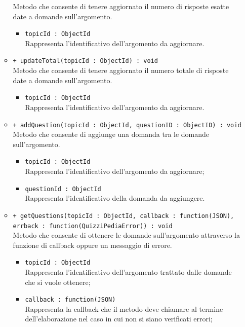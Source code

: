 \begin{itemize}
\begin{itemize}
			Metodo che consente di tenere aggiornato il numero di risposte esatte date a domande sull'argomento. \\
			\begin{itemize}
			\item \texttt{topicId : ObjectId} \\
			Rappresenta l'identificativo dell'argomento da aggiornare.
			\end{itemize}
			\item \texttt{+ updateTotal(topicId : ObjectId) : void} \\
			Metodo che consente di tenere aggiornato il numero totale di risposte date a domande sull'argomento. \\
			\begin{itemize}
			\item \texttt{topicId : ObjectId} \\
			Rappresenta l'identificativo dell'argomento da aggiornare.
			\end{itemize}
			\item \texttt{+ addQuestion(topicId : ObjectId, questionID : ObjectID) : void} \\
			Metodo che consente di aggiunge una domanda tra le domande sull'argomento. \\
			\begin{itemize}
			\item \texttt{topicId : ObjectId} \\
			Rappresenta l'identificativo dell'argomento da aggiornare;
			\item \texttt{questionId : ObjectId} \\
			Rappresenta l'identificativo della domanda da aggiungere.
			\end{itemize}
			\item \texttt{+ getQuestions(topicId : ObjectId, callback : function(JSON), errback : function(QuizziPediaError)) : void} \\
			Metodo che consente di ottenere le domande sull'argomento attraverso la funzione di callback oppure un messaggio di errore. \\
			\begin{itemize}
			\item \texttt{topicId : ObjectId} \\
			Rappresenta l'identificativo dell'argomento trattato dalle domande che si vuole ottenere;
			\item \texttt{callback : function(JSON)} \\
			Rappresenta la callback che il metodo deve chiamare al termine dell'elaborazione nel caso in cui non si siano verificati errori;

\end{itemize}
\end{itemize}
\end{itemize}
